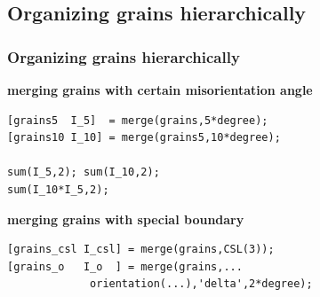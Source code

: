 \subsection{Organizing grains hierarchically}
\begin{frame}[fragile]
  \frametitle{Organizing grains hierarchically}


\begin{overprint}
\textbf{merging grains with certain misorientation angle}
\begin{lstlisting}
[grains5  I_5]  = merge(grains,5*degree);
[grains10 I_10] = merge(grains5,10*degree);

sum(I_5,2); sum(I_10,2);
sum(I_10*I_5,2);
\end{lstlisting}

\textbf{merging grains with special boundary}
\begin{lstlisting}
[grains_csl I_csl] = merge(grains,CSL(3));
[grains_o   I_o  ] = merge(grains,...
             orientation(...),'delta',2*degree);
\end{lstlisting}



\end{overprint}
\end{frame}
